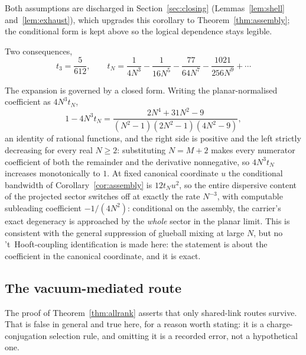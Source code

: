\documentclass[11pt]{article}
\theoremstyle{plain}
\theoremstyle{definition}
\theoremstyle{remark}
\newcommand{\chk}[1]{}
\begin{document}
Both assumptions are discharged in Section~\ref{sec:closing}
(Lemmas~\ref{lem:shell} and~\ref{lem:exhaust}), which upgrades this
corollary to Theorem~\ref{thm:assembly}; the conditional form is kept above
so the logical dependence stays legible.

Two consequences,
\begin{equation}\label{eq:tsmall}
  t_3=\frac{5}{612},\qquad
  t_N=\frac1{4N^3}-\frac1{16N^5}-\frac{77}{64N^7}-\frac{1021}{256N^9}+\cdots
\end{equation}
\chk{t\_2 = 0 and t\_3 = 5/612}\chk{large-N expansion of t\_N through 1/N\^{}9}

The expansion is governed by a closed form. Writing the planar-normalised
coefficient as $4N^3t_N$,
\begin{equation}\label{eq:planar}
  1-4N^3t_N=\frac{2N^4+31N^2-9}{(N^2-1)(2N^2-1)(4N^2-9)},
\end{equation}
an identity of rational functions, and the right side is positive and the
left strictly decreasing for every real $N\ge2$: substituting $N=M+2$ makes
every numerator coefficient of both the remainder and the derivative
nonnegative, so $4N^3t_N$ increases monotonically to $1$. At fixed canonical
coordinate $u$ the conditional bandwidth of Corollary~\ref{cor:assembly} is
$12t_Nu^2$, so the entire dispersive content of the projected sector
switches off at exactly the rate $N^{-3}$, with computable subleading
coefficient $-1/(4N^2)$: conditional on the assembly, the carrier's exact
degeneracy is approached by the \emph{whole} sector in the planar limit.
This is consistent with the general suppression of glueball mixing at large
$N$, but no 't~Hooft-coupling identification is made here: the statement is
about the coefficient in the canonical coordinate, and it is exact.
\chk{deficit identity 1/4 - N\^{}3 t\_N}
\chk{N\^{}3 t\_N increases monotonically to 1/4}

\subsection{The vacuum-mediated route}

The proof of Theorem~\ref{thm:allrank} asserts that only shared-link routes
survive. That is false in general and true here, for a reason worth stating:
it is a charge-conjugation selection rule, and omitting it is a recorded
error, not a hypothetical one.
\end{document}
